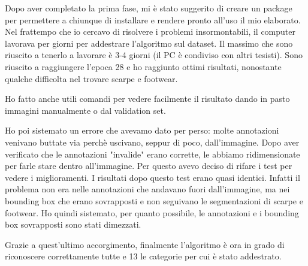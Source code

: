 Dopo aver completato la prima fase, mi è stato suggerito di creare un package per permettere a chiunque di installare e rendere pronto all'uso il mio elaborato.
Nel frattempo che io cercavo di risolvere i problemi insormontabili, il computer lavorava per giorni per addestrare l'algoritmo sul dataset. Il massimo che sono riuscito a tenerlo a lavorare è 3-4 giorni (il PC è condiviso con altri tesisti). Sono riuscito a raggiungere l'epoca 28 e ho raggiunto ottimi risultati, nonostante qualche difficolta nel trovare scarpe e footwear.

Ho fatto anche utili comandi per vedere facilmente il risultato dando in pasto immagini manualmente o dal validation set.

Ho poi sistemato un errore che avevamo dato per perso: molte annotazioni venivano buttate via perchè uscivano, seppur di poco, dall'immagine. Dopo aver verificato che le annotazioni "invalide" erano corrette, le abbiamo ridimensionate per farle stare dentro all'immagine. Per questo avevo deciso di rifare i test per vedere i miglioramenti. I risultati dopo questo test erano quasi identici. Infatti il problema non era nelle annotazioni che andavano fuori dall'immagine, ma nei bounding box che erano sovrapposti e non seguivano le segmentazioni di scarpe e footwear. Ho quindi sistemato, per quanto possibile, le annotazioni e i bounding box sovrapposti sono stati dimezzati.

Grazie a quest'ultimo accorgimento, finalmente l'algoritmo è ora in grado di riconoscere correttamente tutte e 13 le categorie per cui è stato addestrato.



